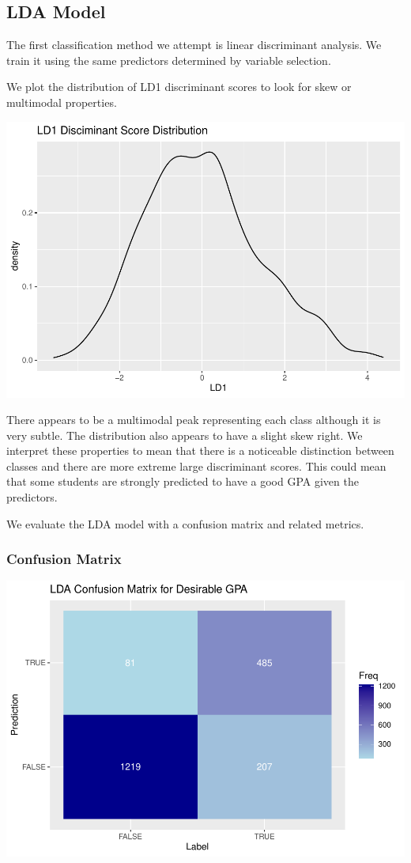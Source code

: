 \documentclass[
]{article}
\begin{document}
\subsection{LDA Model}\label{lda-model}

The first classification method we attempt is linear discriminant
analysis. We train it using the same predictors determined by variable
selection.

We plot the distribution of LD1 discriminant scores to look for skew or
multimodal properties.

\includegraphics{ST494_FP_files/figure-latex/unnamed-chunk-29-1.pdf}

There appears to be a multimodal peak representing each class although
it is very subtle. The distribution also appears to have a slight skew
right. We interpret these properties to mean that there is a noticeable
distinction between classes and there are more extreme large
discriminant scores. This could mean that some students are strongly
predicted to have a good GPA given the predictors.

We evaluate the LDA model with a confusion matrix and related metrics.

\subsubsection{Confusion Matrix}\label{confusion-matrix}

\includegraphics{ST494_FP_files/figure-latex/unnamed-chunk-30-1.pdf}
\end{document}
